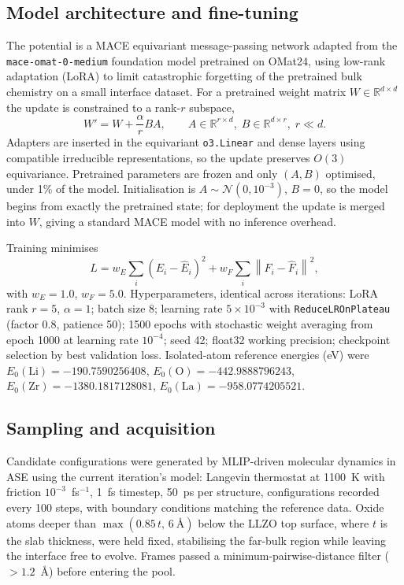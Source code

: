 \documentclass[11pt]{article}
\begin{document}
\subsection{Model architecture and fine-tuning}
The potential is a MACE equivariant message-passing
network\citep{batatia2023mace} adapted from the \texttt{mace-omat-0-medium}
foundation model pretrained on OMat24\citep{omat24}, using low-rank adaptation
(LoRA)\citep{LoRA2021} to limit catastrophic forgetting of the pretrained bulk
chemistry on a small interface dataset. For a pretrained weight matrix
$W\in\mathbb{R}^{d\times d}$ the update is constrained to a rank-$r$ subspace,
\begin{equation}
W' = W + \frac{\alpha}{r}BA,
\qquad A\in\mathbb{R}^{r\times d},\; B\in\mathbb{R}^{d\times r},\; r\ll d .
\end{equation}
Adapters are inserted in the equivariant \texttt{o3.Linear} and dense layers
using compatible irreducible representations, so the update preserves $O(3)$
equivariance. Pretrained parameters are frozen and only $(A,B)$ optimised, under
1\% of the model. Initialisation is $A\sim\mathcal{N}(0,10^{-3})$, $B=0$, so the
model begins from exactly the pretrained state; for deployment the update is
merged into $W$, giving a standard MACE model with no inference overhead.

Training minimises
\begin{equation}
L = w_E\sum_i\left(E_i-\hat{E}_i\right)^2
  + w_F\sum_i\left\|F_i-\hat{F}_i\right\|^2 ,
\end{equation}
with $w_E=1.0$, $w_F=5.0$. Hyperparameters, identical across iterations: LoRA
rank $r=5$, $\alpha=1$; batch size 8; learning rate $5\times10^{-3}$ with
\texttt{ReduceLROnPlateau} (factor 0.8, patience 50); 1500 epochs with stochastic
weight averaging from epoch 1000 at learning rate $10^{-4}$; seed 42; float32
working precision; checkpoint selection by best validation loss. Isolated-atom
reference energies (eV) were $E_0(\mathrm{Li})=-190.7590256408$,
$E_0(\mathrm{O})=-442.9888796243$, $E_0(\mathrm{Zr})=-1380.1817128081$,
$E_0(\mathrm{La})=-958.0774205521$.

\subsection{Sampling and acquisition}
Candidate configurations were generated by MLIP-driven molecular dynamics in
ASE\citep{ase} using the current iteration's model: Langevin thermostat at
1100~K with friction $10^{-3}$~fs$^{-1}$, 1~fs timestep, 50~ps per structure,
configurations recorded every 100 steps, with boundary conditions matching the
reference data. Oxide atoms deeper than $\max(0.85\,t,\,6~\text{\AA})$ below the
LLZO top surface, where $t$ is the slab thickness, were held fixed, stabilising
the far-bulk region while leaving the interface free to evolve. Frames passed a
minimum-pairwise-distance filter ($>1.2$~\AA) before entering the pool.
\end{document}
